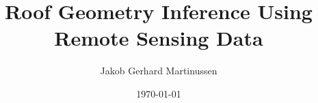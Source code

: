 \documentclass[american]{ntnuthesis}
\title{Roof Geometry Inference Using Remote Sensing Data}
\author{Jakob Gerhard Martinussen}
\date{\today}
\begin{document}
\setcounter{page}{3}

\begin{titlepage}
  \maketitle
\end{titlepage}




\tableofcontents
\listoffigures
\listoftables



\printbibliography

\appendix

\end{document}
